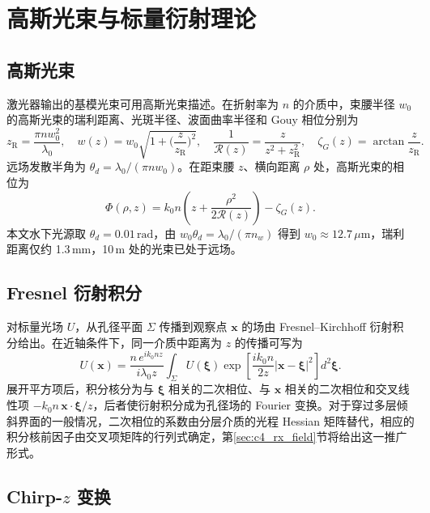 \section{高斯光束与标量衍射理论}
\label{sec:c2_diffraction}

\subsection{高斯光束}

激光器输出的基模光束可用高斯光束描述。在折射率为 $n$ 的介质中，束腰半径 $w_0$ 的高斯光束的瑞利距离、光斑半径、波面曲率半径和 Gouy 相位分别为
\begin{equation}
z_{\mathrm R}=\frac{\pi nw_0^2}{\lambda_0},\quad
w(z)=w_0\sqrt{1+\Big(\frac{z}{z_{\mathrm R}}\Big)^2},\quad
\frac{1}{\mathcal R(z)}=\frac{z}{z^2+z_{\mathrm R}^2},\quad
\zeta_G(z)=\arctan\frac{z}{z_{\mathrm R}}.
\label{eq:c2_gauss}
\end{equation}
远场发散半角为 $\theta_d=\lambda_0/(\pi nw_0)$。在距束腰 $z$、横向距离 $\rho$ 处，高斯光束的相位为
\begin{equation}
\Phi(\rho,z)=k_0n\left(z+\frac{\rho^2}{2\mathcal R(z)}\right)-\zeta_G(z).
\label{eq:c2_gauss_phase}
\end{equation}
本文水下光源取 $\theta_d=0.01\,\mathrm{rad}$，由 $w_0\theta_d=\lambda_0/(\pi n_w)$ 得到 $w_0\approx12.7\,\mu\mathrm m$，瑞利距离仅约 1.3\,mm，10\,m 处的光束已处于远场。

\subsection{Fresnel 衍射积分}

对标量光场 $U$，从孔径平面 $\Sigma$ 传播到观察点 $\mathbf x$ 的场由 Fresnel--Kirchhoff 衍射积分给出。在近轴条件下，同一介质中距离为 $z$ 的传播可写为
\begin{equation}
U(\mathbf x)=\frac{n\,e^{ik_0nz}}{i\lambda_0z}\int_\Sigma U(\boldsymbol\xi)
\exp\!\left[\frac{ik_0n}{2z}|\mathbf x-\boldsymbol\xi|^2\right]d^2\boldsymbol\xi.
\label{eq:c2_fresnel_int}
\end{equation}
展开平方项后，积分核分为与 $\boldsymbol\xi$ 相关的二次相位、与 $\mathbf x$ 相关的二次相位和交叉线性项 $-k_0n\,\mathbf x\cdot\boldsymbol\xi/z$，后者使衍射积分成为孔径场的 Fourier 变换。对于穿过多层倾斜界面的一般情况，二次相位的系数由分层介质的光程 Hessian 矩阵替代，相应的积分核前因子由交叉项矩阵的行列式确定，第\ref{sec:c4_rx_field}节将给出这一推广形式。

\subsection{Chirp-$z$ 变换}

